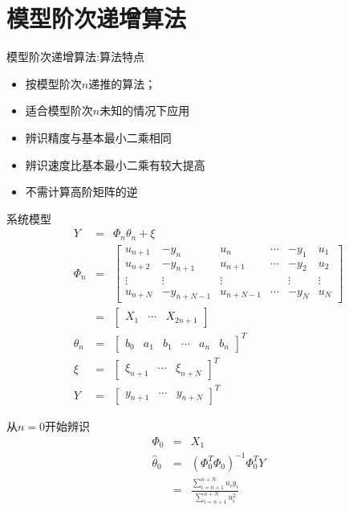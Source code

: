 \section{模型阶次递增算法}
\begin{frame}{模型阶次递增算法:算法特点}
\begin{itemize}
\item 按模型阶次$n$递推的算法；
\item 适合模型阶次$n$未知的情况下应用
\item 辨识精度与基本最小二乘相同
\item 辨识速度比基本最小二乘有较大提高
\item 不需计算高阶矩阵的逆
\end{itemize}
\end{frame}

\begin{frame}{系统模型}
\begin{eqnarray*}
Y &=& \Phi_n\theta_n +\xi \\
\Phi_n &=& \begin{bmatrix}
u_{n+1}  &   -y_{n}    & u_{n}      & \cdots & -y_{1}  & u_{1}  \\
u_{n+2}  &   -y_{n+1}  & u_{n+1}    & \cdots & -y_{2}  & u_{2}  \\
\vdots   &   \vdots    & \vdots     &        & \vdots  & \vdots \\
u_{n+N}  &   -y_{n+N-1} & u_{n+N-1} & \cdots & -y_{N}  & u_{N}
\end{bmatrix} \\
&=& \begin{bmatrix}X_1 & \cdots & X_{2n+1} \end{bmatrix} \\
\theta_n &=& \begin{bmatrix}b_0 & a_1 & b_1 & \cdots & a_n & b_n \end{bmatrix}^T \\
\xi &=& \begin{bmatrix}\xi_{n+1} &\cdots & \xi_{n+N}\end{bmatrix}^T  \\
Y &=& \begin{bmatrix}y_{n+1} &\cdots & y_{n+N}\end{bmatrix}^T 
\end{eqnarray*}
\end{frame}

\begin{frame}{从$n=0$开始辨识}
\begin{eqnarray*}
\Phi_0 &=& X_1 \\
\hat\theta_0 &=& (\Phi_0^T\Phi_0)^{-1}\Phi_0^T Y \\
&=& \frac{\displaystyle \sum_{i=n+1}^{n+N}u_iy_i}{\displaystyle \sum_{i=n+1}^{n+N}u_i^2}
\end{eqnarray*}
\end{frame}

